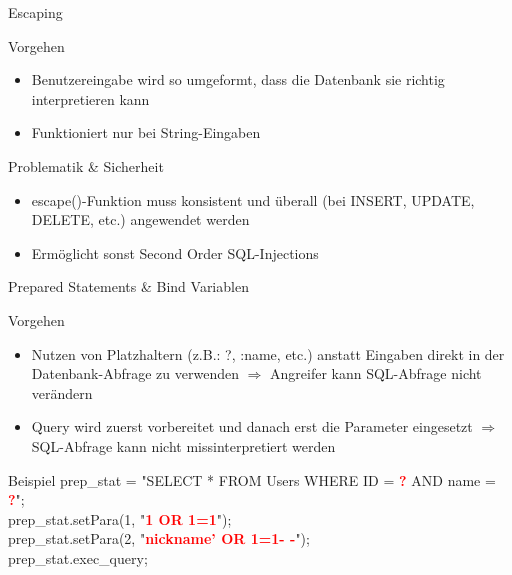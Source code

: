 \begin{frame}{Escaping}
\begin{block}{Vorgehen}
\begin{itemize}
\item Benutzereingabe wird so umgeformt, dass die Datenbank sie richtig interpretieren kann
\item Funktioniert nur bei String-Eingaben
\end{itemize}
\end{block}
\begin{block}{Problematik \& Sicherheit}
\begin{itemize}[<+->]
\item escape()-Funktion muss konsistent und überall (bei INSERT, UPDATE, DELETE, etc.) angewendet werden
\item Ermöglicht sonst Second Order SQL-Injections
\end{itemize}
\end{block}
\end{frame}

\begin{frame}{Prepared Statements \& Bind Variablen}
\begin{block}{Vorgehen}
\begin{itemize}[<+->]
	\item Nutzen von Platzhaltern (z.B.: ?, :name, etc.) anstatt Eingaben direkt in der Datenbank-Abfrage zu verwenden $\Rightarrow$ Angreifer kann SQL-Abfrage nicht verändern

	\item Query wird zuerst vorbereitet und danach erst die Parameter eingesetzt $\Rightarrow$ SQL-Abfrage kann nicht missinterpretiert werden

\end{itemize}
\end{block}
\begin{block}{Beispiel}
prep\_stat = "{}SELECT * FROM Users WHERE ID = \textcolor{red}{\textbf{?}} AND name = \textcolor{red}{\textbf{?}}"{}; \\
prep\_stat.setPara(1, "{}\textcolor{red}{\textbf{1 OR 1=1}}{}"); \\
prep\_stat.setPara(2, "{}\textcolor{red}{\textbf{nickname'{} OR 1=1- -}}{}"); \\
prep\_stat.exec\_query;
\end{block}
\end{frame}

